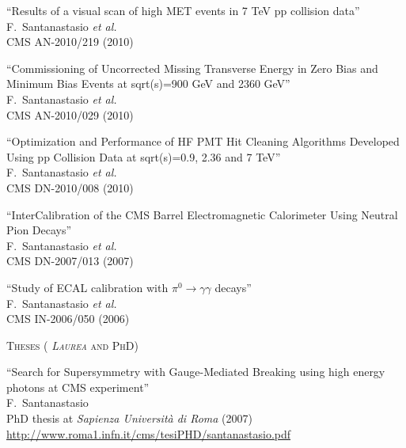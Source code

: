 \documentclass[10pt, a4paper]{article}
\begin{document}
\begin{thebibliography}{599}
``Results of a visual scan of high MET events in 7 TeV pp collision data''
  \\{}F.~Santanastasio {\it et al.}
  \\{}CMS AN-2010/219 (2010)
  
``Commissioning of Uncorrected Missing Transverse Energy in Zero Bias and Minimum Bias Events at  sqrt(s)=900 GeV and  2360 GeV''
  \\{}F.~Santanastasio {\it et al.}
  \\{}CMS AN-2010/029 (2010)

``Optimization and Performance of HF PMT Hit Cleaning Algorithms Developed Using pp Collision Data at sqrt(s)=0.9, 2.36 and 7 TeV''
  \\{}F.~Santanastasio {\it et al.}
  \\{}CMS DN-2010/008 (2010)

``InterCalibration of the CMS Barrel Electromagnetic Calorimeter Using Neutral Pion Decays''
   \\{}F.~Santanastasio {\it et al.}
  \\{}CMS DN-2007/013 (2007)

``Study of ECAL calibration with $\pi^0 \rightarrow \gamma \gamma$ decays''
\\{}F.~Santanastasio {\it et al.}
\\{}CMS IN-2006/050 (2006)


\vspace{0.1cm} \begin{center} \textsc{Theses ( \textit{Laurea} and PhD)} \end{center} \vspace{0.05cm}

``Search for Supersymmetry with Gauge-Mediated Breaking using high energy photons at CMS experiment''
  \\{}F.~Santanastasio
  \\{}PhD thesis at \textit{Sapienza Universit\`a di Roma} (2007)
 \\{}\href{http://www.roma1.infn.it/cms/tesiPHD/santanastasio.pdf}{http://www.roma1.infn.it/cms/tesiPHD/santanastasio.pdf}


\end{thebibliography}
\end{document}
